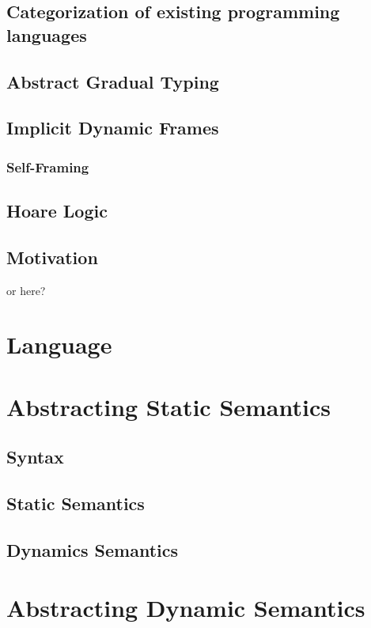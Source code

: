 \section{Categorization of existing programming languages}

\section{Abstract Gradual Typing}

\section{Implicit Dynamic Frames}

\subsection{Self-Framing}

\section{Hoare Logic}

\section{Motivation}
or here?


\chapter{Language}


\chapter{Abstracting Static Semantics}

\section{Syntax}

\section{Static Semantics}

\section{Dynamics Semantics}


\chapter{Abstracting Dynamic Semantics}


